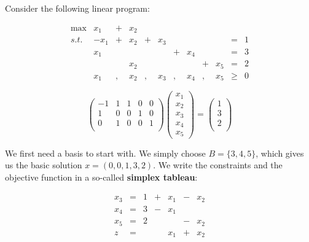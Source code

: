 \documentclass[12pt, showidx, twoside]{article}
\def\hi{\bf}
\begin{document}
{{{%


Consider the following linear program:

\begin{equation*}
\begin{array}{rrcrccrcrcrl}
\max  &  x_1 & + &  x_2 &   &     &   &     &   &     &     &  \\
 s.t. & -x_1 & + &  x_2 & + & x_3 &   &     &   &     &  =  & 1\\
      &  x_1 &   &      &   &     & + & x_4 &   &     &  =  & 3\\
      &      &   &  x_2 &   &     &   &     & + & x_5 &  =  & 2\\
      &  x_1 & , &  x_2 & , & x_3 & , & x_4 & ,  & x_5 & \geq & 0
\end{array}
\end{equation*}

\[
\left(
\begin{array}{ccccc}
  -1 & 1 & 1 & 0 & 0\\
   1 & 0 & 0 & 1 & 0\\
   0 & 1 & 0 & 0 & 1\\
\end{array}
\right)
\left(
   \begin{array}{c}
       x_1\\
       x_2\\
       x_3\\
       x_4\\
       x_5
   \end{array}
\right)
= 
\left(
   \begin{array}{c}
       1\\
       3\\
       2\\
   \end{array}
\right)
\] 

We first need a basis to start with. We simply choose $B=\{3,4,5\}$, which gives us the
basic solution $x = (0,0,1,3,2)$.
We write the constraints and the objective function in a so-called 
{\hi simplex tableau}:

\[
\begin{array}{ccccccc}
x_3 & = & 1 & + & x_1 & - & x_2 \\
x_4 & = & 3 & - & x_1 &   &     \\
x_5 & = & 2 &   &     & - & x_2 \\ \hline
z   & = &   &   & x_1 & + & x_2 \\
\end{array}
\]

}}}
\end{document}
